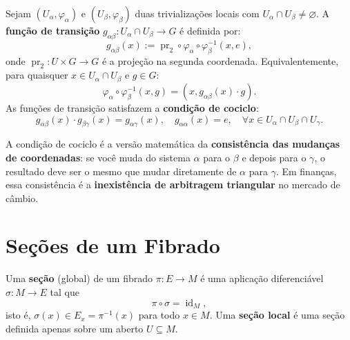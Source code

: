 \begin{defi}\label{def:transicao}
Sejam $(U_\alpha, \varphi_\alpha)$ e $(U_\beta, \varphi_\beta)$ duas
trivializa\c{c}\~oes locais com $U_\alpha \cap U_\beta \neq \varnothing$.
A \textbf{fun\c{c}\~ao de transi\c{c}\~ao} $g_{\alpha\beta}: U_\alpha \cap
U_\beta \to G$ \'e definida por:
\begin{equation}\label{eq:transicao_def}
 g_{\alpha\beta}(x) := \operatorname{pr}_2 \circ \varphi_\alpha \circ
 \varphi_\beta^{-1}(x, e),
\end{equation}
onde $\operatorname{pr}_2: U \times G \to G$ \'e a proje\c{c}\~ao na segunda
coordenada. Equivalentemente, para quaisquer $x \in U_\alpha \cap U_\beta$ e
$g \in G$:
\begin{equation}\label{eq:cocycle}
 \varphi_\alpha \circ \varphi_\beta^{-1}(x, g) = (x, g_{\alpha\beta}(x) \cdot g).
\end{equation}
As fun\c{c}\~oes de transi\c{c}\~ao satisfazem a \textbf{condi\c{c}\~ao de
cociclo}:
\begin{equation}\label{eq:cocycle_cond}
 g_{\alpha\beta}(x) \cdot g_{\beta\gamma}(x) = g_{\alpha\gamma}(x), \quad
 g_{\alpha\alpha}(x) = e, \quad \forall x \in U_\alpha \cap U_\beta \cap
 U_\gamma.
\end{equation}
\end{defi}

A condi\c{c}\~ao de cociclo \'e a vers\~ao matem\'atica da
\textbf{consist\^encia das mudan\c{c}as de coordenadas}: se voc\^e muda do
sistema $\alpha$ para o $\beta$ e depois para o $\gamma$, o resultado deve
ser o mesmo que mudar diretamente de $\alpha$ para $\gamma$. Em finan\c{c}as,
essa consist\^encia \'e a \textbf{inexist\^encia de arbitragem triangular} no
mercado de c\^ambio.

\section{Se\c{c}\~oes de um Fibrado}

\begin{defi}[Se\c{c}\~ao]\label{def:secao}
Uma \textbf{se\c{c}\~ao} (global) de um fibrado $\pi: E \to M$ \'e uma
aplica\c{c}\~ao diferenci\'avel $\sigma: M \to E$ tal que
\begin{equation}\label{eq:secao}
 \pi \circ \sigma = \operatorname{id}_M,
\end{equation}
isto \'e, $\sigma(x) \in E_x = \pi^{-1}(x)$ para todo $x \in M$. Uma
\textbf{se\c{c}\~ao local} \'e uma se\c{c}\~ao definida apenas sobre um
aberto $U \subseteq M$.
\end{defi}

